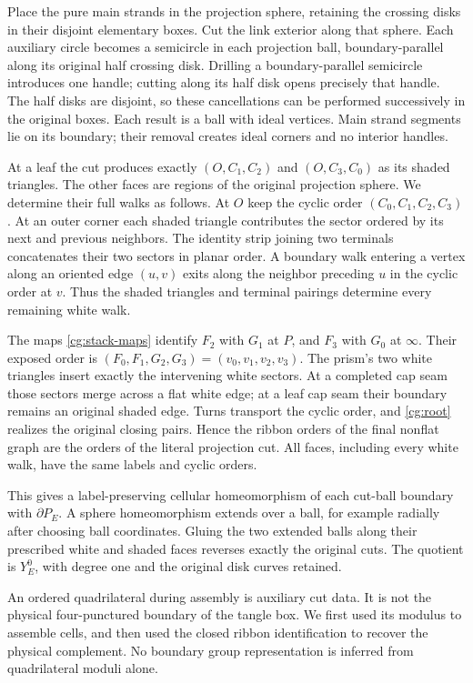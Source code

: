 Place the pure main strands in the projection sphere, retaining
the crossing disks in their disjoint elementary boxes. Cut the
link exterior along that sphere. Each auxiliary circle becomes
a semicircle in each projection ball, boundary-parallel along its
original half crossing disk. Drilling a boundary-parallel semicircle
introduces one handle; cutting along its half disk opens precisely
that handle. The half disks are disjoint, so these cancellations
can be performed successively in the original boxes. Each result
is a ball with ideal vertices. Main strand segments lie on its
boundary; their removal creates ideal corners and no interior
handles.

At a leaf the cut produces exactly
$(O,C_1,C_2)$ and $(O,C_3,C_0)$ as its shaded triangles.
The other faces are regions of the original projection sphere.
We determine their full walks as follows. At $O$ keep the cyclic
order $(C_0,C_1,C_2,C_3)$. At an outer corner each shaded triangle
contributes the sector ordered by its next and previous neighbors.
The identity strip joining two terminals concatenates their two
sectors in planar order. A boundary walk entering a vertex along
an oriented edge $(u,v)$ exits along the neighbor preceding $u$
in the cyclic order at $v$. Thus the shaded triangles and terminal
pairings determine every remaining white walk.

The maps \eqref{cg:stack-maps} identify $F_2$ with $G_1$ at $P$,
and $F_3$ with $G_0$ at $\infty$. Their exposed order is
$(F_0,F_1,G_2,G_3)=(v_0,v_1,v_2,v_3)$. The prism's two white
triangles insert exactly the intervening white sectors.
At a completed cap seam those sectors merge across a flat
white edge; at a leaf cap seam their boundary remains an original
shaded edge. Turns transport the cyclic order, and
\eqref{cg:root} realizes the original closing pairs. Hence the
ribbon orders of the final nonflat graph are the orders of the
literal projection cut. All faces, including every white walk,
have the same labels and cyclic orders.

This gives a label-preserving cellular homeomorphism of each
cut-ball boundary with $\partial P_E$. A sphere homeomorphism
extends over a ball, for example radially after choosing ball
coordinates. Gluing the two extended balls along their prescribed
white and shaded faces reverses exactly the original cuts.
The quotient is $Y^0_E$, with degree one and the original disk
curves retained.

An ordered quadrilateral during assembly is auxiliary cut data.
It is not the physical four-punctured boundary of the tangle box.
We first used its modulus to assemble cells, and then used the
closed ribbon identification to recover the physical complement.
No boundary group representation is inferred from quadrilateral
moduli alone.

